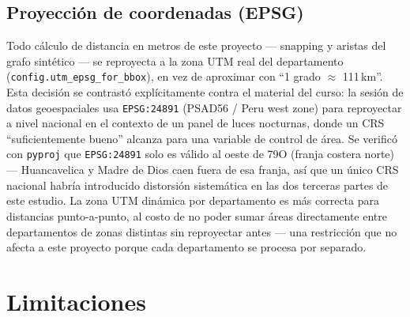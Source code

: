 \documentclass[11pt]{article}
\begin{document}
\subsection{Proyección de coordenadas (EPSG)}

Todo cálculo de distancia en metros de este proyecto --- snapping y aristas
del grafo sintético --- se reproyecta a la zona UTM real del departamento
(\texttt{config.utm\_epsg\_for\_bbox}), en vez de aproximar con
``1 grado $\approx$ 111\,km''. Esta decisión se contrastó explícitamente
contra el material del curso: la sesión de datos geoespaciales usa
\texttt{EPSG:24891} (PSAD56 / Peru west zone) para reproyectar a nivel
nacional en el contexto de un panel de luces nocturnas, donde un CRS
``suficientemente bueno'' alcanza para una variable de control de área. Se
verificó con \texttt{pyproj} que \texttt{EPSG:24891} solo es válido al
oeste de 79\textdegree{}O (franja costera norte) --- Huancavelica y Madre de
Dios caen fuera de esa franja, así que un único CRS nacional habría
introducido distorsión sistemática en las dos terceras partes de este
estudio. La zona UTM dinámica por departamento es más correcta para
distancias punto-a-punto, al costo de no poder sumar áreas directamente
entre departamentos de zonas distintas sin reproyectar antes --- una
restricción que no afecta a este proyecto porque cada departamento se
procesa por separado.

\section{Limitaciones}
\end{document}
